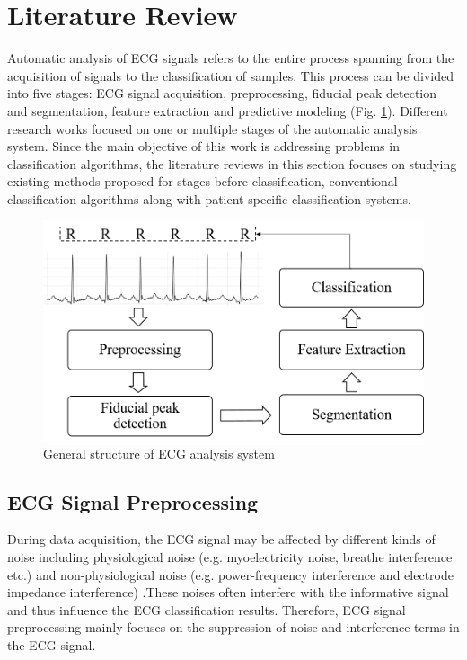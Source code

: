 \section{Literature Review}
Automatic analysis of ECG signals refers to the entire process spanning from the acquisition of signals to the classification of samples. This process can be divided into five stages: ECG signal acquisition, preprocessing, fiducial peak detection and segmentation, feature extraction and predictive modeling (Fig. \ref{fig:1-1}). Different research works focused on one or multiple stages of the automatic analysis system. Since the main objective of this work is addressing problems in classification algorithms, the literature reviews in this section focuses on studying existing methods proposed for stages before classification, conventional classification algorithms along with patient-specific classification systems. 

 \begin{figure}[thpb]
 	\centering
 	\includegraphics[scale=0.7]{Fig/general_flow.png}  
 	\caption{General structure of ECG analysis system}
 	\label{fig:1-1}
 \end{figure}


\subsection{ECG Signal Preprocessing}

During data acquisition, the ECG signal may be affected by  different kinds of noise including physiological noise (e.g. myoelectricity noise, breathe interference etc.) and non-physiological noise (e.g. power-frequency interference and electrode impedance interference) \cite{denoise}.These noises often interfere with the informative signal and thus influence the ECG classification results. Therefore, ECG signal preprocessing mainly focuses on the suppression of noise and interference terms in the ECG signal.

